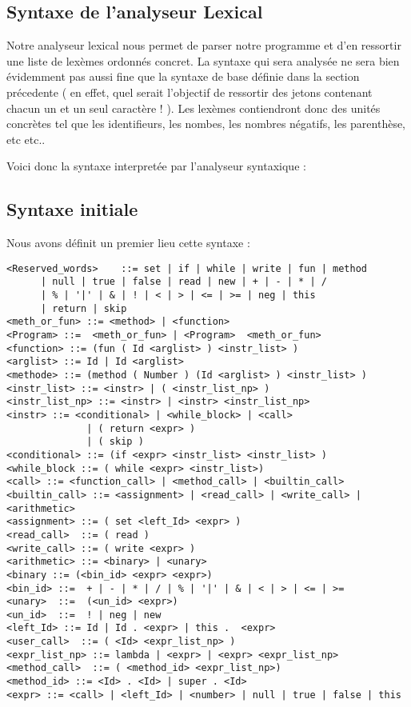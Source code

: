 \subsection{Syntaxe de l'analyseur Lexical}

Notre analyseur lexical nous permet de parser notre programme et d'en ressortir une liste de lexèmes ordonnés concret. 
La syntaxe qui sera analysée ne sera bien évidemment pas aussi fine que la syntaxe de base définie dans la section précedente 
( en effet, quel serait l'objectif de ressortir des jetons contenant chacun un et un seul caractère ! ). 
Les lexèmes contiendront donc des unités concrètes tel que les identifieurs, les nombes, les nombres négatifs, les parenthèse, etc etc..


Voici donc la syntaxe interpretée par l'analyseur syntaxique :

\subsection{Syntaxe initiale}
Nous avons définit un premier lieu cette syntaxe : 

\begin{verbatim}
<Reserved_words>    ::= set | if | while | write | fun | method 
      | null | true | false | read | new | + | - | * | / 
      | % | '|' | & | ! | < | > | <= | >= | neg | this 
      | return | skip
<meth_or_fun> ::= <method> | <function>
<Program> ::=  <meth_or_fun> | <Program>  <meth_or_fun>
<function> ::= (fun ( Id <arglist> ) <instr_list> ) 
<arglist> ::= Id | Id <arglist>
<methode> ::= (method ( Number ) (Id <arglist> ) <instr_list> )
<instr_list> ::= <instr> | ( <instr_list_np> ) 
<instr_list_np> ::= <instr> | <instr> <instr_list_np>
<instr> ::= <conditional> | <while_block> | <call> 
			  | ( return <expr> ) 
			  | ( skip )
<conditional> ::= (if <expr> <instr_list> <instr_list> ) 
<while_block ::= ( while <expr> <instr_list>) 
<call> ::= <function_call> | <method_call> | <builtin_call> 
<builtin_call> ::= <assignment> | <read_call> | <write_call> | <arithmetic>
<assignment> ::= ( set <left_Id> <expr> ) 
<read_call>  ::= ( read ) 
<write_call> ::= ( write <expr> )
<arithmetic> ::= <binary> | <unary>
<binary ::= (<bin_id> <expr> <expr>)
<bin_id> ::=  + | - | * | / | % | '|' | & | < | > | <= | >=
<unary>  ::=  (<un_id> <expr>)
<un_id>  ::=  ! | neg | new
<left_Id> ::= Id | Id . <expr> | this .  <expr>
<user_call>  ::= ( <Id> <expr_list_np> )
<expr_list_np> ::= lambda | <expr> | <expr> <expr_list_np>
<method_call>  ::= ( <method_id> <expr_list_np>)
<method_id> ::= <Id> . <Id> | super . <Id> 
<expr> ::= <call> | <left_Id> | <number> | null | true | false | this  
\end{verbatim}


